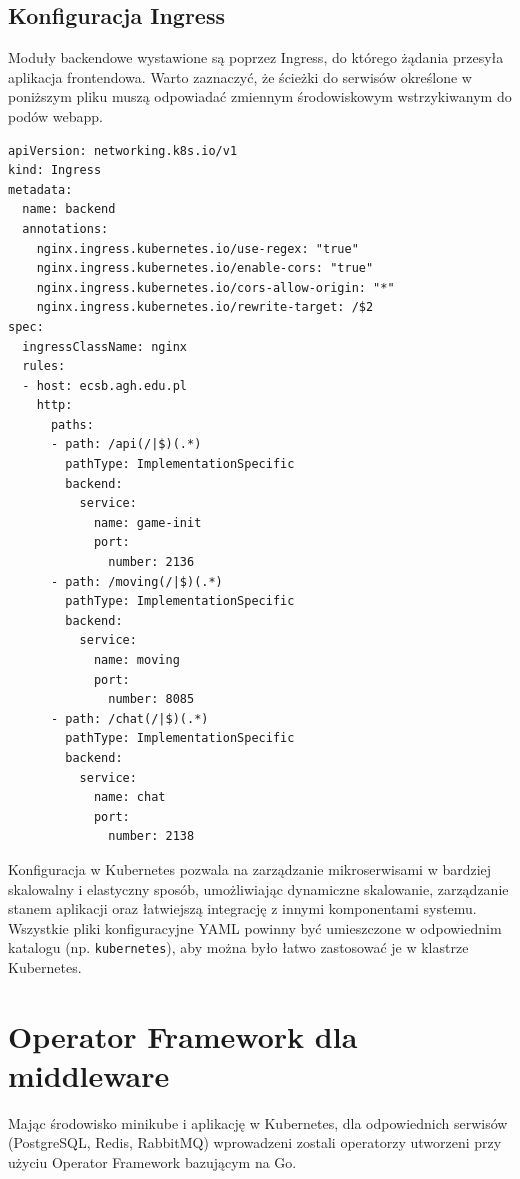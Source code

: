 \documentclass[polish]{aghengthesis}
\begin{document}
\subsection{Konfiguracja Ingress}

Moduły backendowe wystawione są poprzez Ingress, do którego żądania przesyła aplikacja frontendowa. Warto zaznaczyć, że ścieżki do serwisów określone w poniższym pliku muszą odpowiadać zmiennym środowiskowym wstrzykiwanym do podów webapp.
\begin{lstlisting}[caption=Konfiguracja Ingress serwisów backendowych]
apiVersion: networking.k8s.io/v1
kind: Ingress
metadata:
  name: backend
  annotations:
    nginx.ingress.kubernetes.io/use-regex: "true"
    nginx.ingress.kubernetes.io/enable-cors: "true"
    nginx.ingress.kubernetes.io/cors-allow-origin: "*"
    nginx.ingress.kubernetes.io/rewrite-target: /$2
spec:
  ingressClassName: nginx
  rules:
  - host: ecsb.agh.edu.pl
    http:
      paths:
      - path: /api(/|$)(.*)
        pathType: ImplementationSpecific
        backend:
          service:
            name: game-init
            port:
              number: 2136
      - path: /moving(/|$)(.*)
        pathType: ImplementationSpecific
        backend:
          service:
            name: moving
            port:
              number: 8085
      - path: /chat(/|$)(.*)
        pathType: ImplementationSpecific
        backend:
          service:
            name: chat
            port:
              number: 2138
\end{lstlisting}

Konfiguracja w Kubernetes pozwala na zarządzanie mikroserwisami w bardziej skalowalny i elastyczny sposób, umożliwiając dynamiczne skalowanie, zarządzanie stanem aplikacji oraz łatwiejszą integrację z innymi komponentami systemu. Wszystkie pliki konfiguracyjne YAML powinny być umieszczone w odpowiednim katalogu (np. \texttt{kubernetes}), aby można było łatwo zastosować je w klastrze Kubernetes.

\newpage

\section{Operator Framework dla middleware}
Mając środowisko minikube i aplikację w Kubernetes, dla odpowiednich serwisów (PostgreSQL, Redis, RabbitMQ) wprowadzeni zostali operatorzy utworzeni przy użyciu Operator Framework bazującym na Go.
\end{document}
